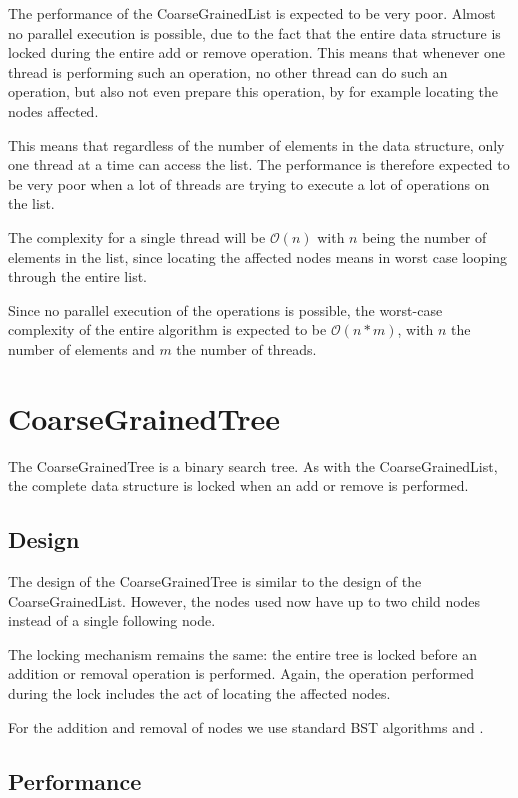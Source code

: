 \documentclass[a4paper]{article}
\def\bigoh{\mathcal{O}}
\begin{document}
The performance of the CoarseGrainedList is expected to be very poor. Almost
no parallel execution is possible, due to the fact that the entire
data structure is locked during the entire add or remove operation. This means
that whenever one thread is performing such an operation, no other thread can
do such an operation, but also not even prepare this operation, by for example
locating the nodes affected.

This means that regardless of the number of elements in the data structure,
only one thread at a time can access the list. The performance is therefore
expected to be very poor when a lot of threads are trying to execute a lot
of operations on the list.

The complexity for a single thread will be $\bigoh(n)$ with $n$ being
the number of elements in the list, since
locating the affected nodes means in worst case looping through the entire
list.

Since no parallel execution of the operations is possible, the worst-case
complexity of the entire algorithm is expected to be $\bigoh(n * m)$,
with $n$ the number of elements and $m$ the number of threads.

\section{CoarseGrainedTree}

The CoarseGrainedTree is a binary search tree. As with the
CoarseGrainedList, the complete data structure is locked when
an add or remove is performed.

\subsection{Design}

The design of the CoarseGrainedTree is similar to the design of the
CoarseGrainedList. However, the nodes used now have up to two child nodes
instead of a single following node.

The locking mechanism remains the same: the entire tree is locked before
an addition or removal operation is performed. Again, the operation performed
during the lock includes the act of locating the affected nodes.

For the addition and removal of nodes we use standard BST algorithms
\cite{insert} and \cite{delete}.

\subsection{Performance}
\end{document}
